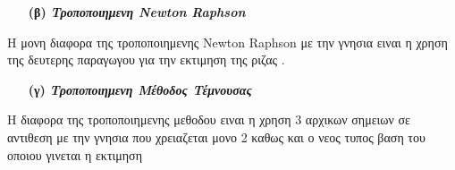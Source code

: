 \documentclass[a4paper,11pt]{article}
\begin{document}
	\begin{enumerate}
		\item[\textbf{(β)}] \emph {\textbf{Τροποποιημενη Newton Raphson}}
	\end{enumerate}
	\begin{center}
		Η μονη διαφορα της τροποποιημενης Newton Raphson με την γνησια ειναι η χρηση της δευτερης παραγωγου για την εκτιμηση της ριζας . 
	\end{center}
	
	\begin{enumerate}
		\item[\textbf{(γ)}] \emph {\textbf{Τροποποιημενη Μέθοδος Τέμνουσας}}
	\end{enumerate}
	\begin{center}
		Η διαφορα της τροποποιημενης μεθοδου ειναι η χρηση 3 αρχικων σημειων σε αντιθεση με την γνησια που χρειαζεται μονο 2 καθως και ο νεος τυπος βαση του οποιου γινεται η εκτιμηση 
	\end{center}
	
\end{document}
